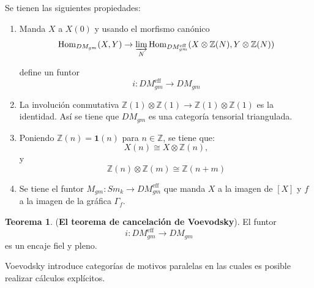 \documentclass[10pt]{amsart}
\theoremstyle{definition}
\newtheorem{theorem}[definition]{Teorema}
\theoremstyle{remark}
\theoremstyle{definition}
\begin{document}
Se tienen las siguientes propiedades:
\begin{enumerate}
\item Manda $X$ a $X(0)$ y usando el morfismo canónico
\[
\operatorname{Hom}_{DM_{gm}}(X, Y) \to \varinjlim_{N} \operatorname{Hom}_{DM^{\text{eff}}_{gm}}(X \otimes \mathbb{Z}(N), Y \otimes \mathbb{Z}(N))
\]

define un funtor 
\begin{equation*}
i:DM^{\textrm{eff}}_{gm} \rightarrow DM_{gm}
\end{equation*}

\item La involución conmutativa $\mathbb{Z}(1) \otimes \mathbb{Z}(1) \rightarrow \mathbb{Z}(1) \otimes \mathbb{Z}(1)$ es la identidad. Así se tiene que $DM_{gm}$ es una categoría tensorial triangulada.

\item Poniendo $\mathbb{Z}(n)=\textbf{1}(n)$ para $n \in \mathbb{Z}$, se tiene que:
\begin{equation*}
X(n) \cong X \otimes \mathbb{Z}(n),
\end{equation*}
y
\begin{equation*}
\mathbb{Z}(n) \otimes \mathbb{Z}(m) \cong \mathbb{Z}(n+m)
\end{equation*}

\item Se tiene el funtor $M_{gm}:Sm_{\mathit{k}} \rightarrow DM^{\textrm{eff}}_{gm}$ que manda $X$ a la imagen de $[X]$ y $f$ a la imagen de la gráfica $\Gamma_{f}$.
\end{enumerate}
\begin{theorem}(\textbf{El teorema de cancelación de Voevodsky}). El funtor
\begin{equation*}
i:DM^{\textrm{eff}}_{gm} \rightarrow DM_{gm}
\end{equation*}
es un encaje fiel y pleno.
\end{theorem}

Voevodsky introduce categorías de motivos paralelas en las cuales es posible realizar cálculos explícitos. 
\end{document}
